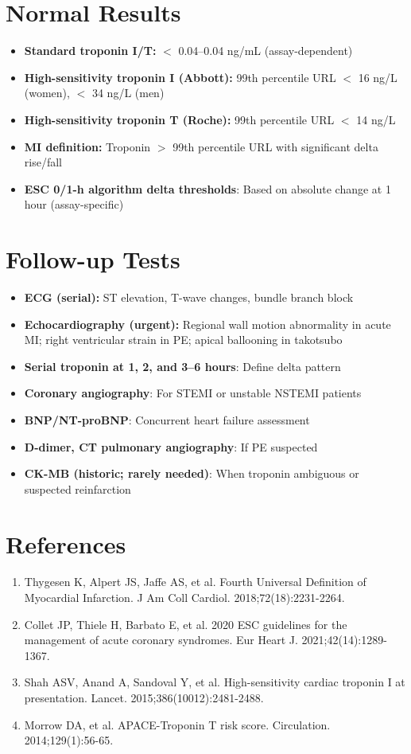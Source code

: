 \section*{Normal Results}
\begin{itemize}
  \item \textbf{Standard troponin I/T:} $<$ 0.04--0.04 ng/mL (assay-dependent)
  \item \textbf{High-sensitivity troponin I (Abbott):} 99th percentile URL $<$ 16 ng/L (women), $<$ 34 ng/L (men)
  \item \textbf{High-sensitivity troponin T (Roche):} 99th percentile URL $<$ 14 ng/L
  \item \textbf{MI definition:} Troponin $>$ 99th percentile URL with significant delta rise/fall
  \item \textbf{ESC 0/1-h algorithm delta thresholds}: Based on absolute change at 1 hour (assay-specific)
\end{itemize}

\section*{Follow-up Tests}
\begin{itemize}
  \item \textbf{ECG (serial):} ST elevation, T-wave changes, bundle branch block
  \item \textbf{Echocardiography (urgent):} Regional wall motion abnormality in acute MI; right ventricular strain in PE; apical ballooning in takotsubo
  \item \textbf{ Serial troponin at 1, 2, and 3--6 hours}: Define delta pattern
  \item \textbf{Coronary angiography}: For STEMI or unstable NSTEMI patients
  \item \textbf{BNP/NT-proBNP}: Concurrent heart failure assessment
  \item \textbf{D-dimer, CT pulmonary angiography}: If PE suspected
  \item \textbf{CK-MB (historic; rarely needed)}: When troponin ambiguous or suspected reinfarction
\end{itemize}

\section*{References}
\begin{enumerate}
  \item Thygesen K, Alpert JS, Jaffe AS, et al. Fourth Universal Definition of Myocardial Infarction. J Am Coll Cardiol. 2018;72(18):2231-2264.
  \item Collet JP, Thiele H, Barbato E, et al. 2020 ESC guidelines for the management of acute coronary syndromes. Eur Heart J. 2021;42(14):1289-1367.
  \item Shah ASV, Anand A, Sandoval Y, et al. High-sensitivity cardiac troponin I at presentation. Lancet. 2015;386(10012):2481-2488.
  \item Morrow DA, et al. APACE-Troponin T risk score. Circulation. 2014;129(1):56-65.
\end{enumerate}

\clearpage